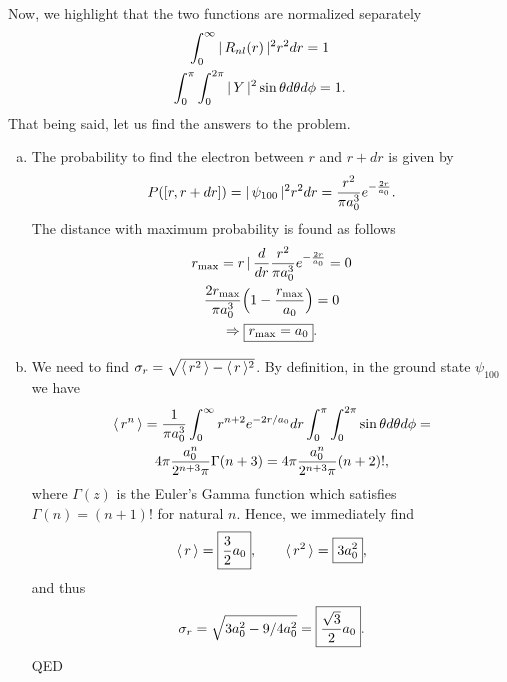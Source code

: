 Now, we highlight that the two functions are normalized separately
\begin{gather}
    \int_0^\infty |\, R_{nl} (r) \,|^2 r^2 dr = 1 \\
    \int_0^\pi \int_0^{2 \pi} |\, Y \,|^2 \sin \theta d\theta d\phi = 1.
\end{gather}
That being said, let us find the answers to the problem.
\begin{enumerate}[(a)]
    \item The probability to find the electron between $r$ and $r+dr$ is given by
    \begin{equation}
        P([r, r+dr]) = |\, \psi_{100} \,|^2 r^2 dr = \frac{r^2}{\pi a_0^3} e^{-\frac{2r}{a_0}}.
    \end{equation}
    The distance with maximum probability is found as follows
    \begin{gather}
        r_\textup{max} = r \, | \, \frac{d}{dr} \frac{r^2}{\pi a_0^3} e^{-\frac{2r}{a_0}} = 0 \notag \\
        \frac{2r_\textup{max}}{\pi a_0^3} \Bigl( 1 - \frac{r_\textup{max}}{a_0} \Bigr) = 0 \notag \\
        \Rightarrow \boxed{r_\textup{max}=a_0}.
    \end{gather}
    \item We need to find $\sigma_r = \sqrt{\langle \, r^2 \, \rangle - \langle \, r \, \rangle^2}$. By definition, in the ground state $\psi_{100}$ we have
    \begin{gather}
        \langle \, r^n \, \rangle = \frac{1}{\pi a_0^3} \int_0^\infty r^{n+2} e^{-2r/a_0} dr \int_0^\pi \int_0^{2 \pi} \sin \theta d\theta d\phi = \notag \\
        4 \pi \frac{a_0^{n}}{2^{n+3} \pi} \Gamma (n+3) = 4 \pi \frac{a_0^{n}}{2^{n+3} \pi} (n+2)!,
    \end{gather}
    where $\Gamma(z)$ is the Euler's Gamma function which satisfies $\Gamma(n) = (n+1)!$ for natural $n$. Hence, we immediately find
    \begin{equation}
        \langle \, r \, \rangle = \boxed{\frac{3}{2} a_0}, \qquad \langle \, r^2 \, \rangle = \boxed{3 a_0^2},
    \end{equation}
    and thus
    \begin{equation}
        \sigma_r = \sqrt{3a_0^2 - 9/4 a_0^2} = \boxed{\frac{\sqrt{3}}{2} a_0}.
    \end{equation}
    QED
\end{enumerate}
